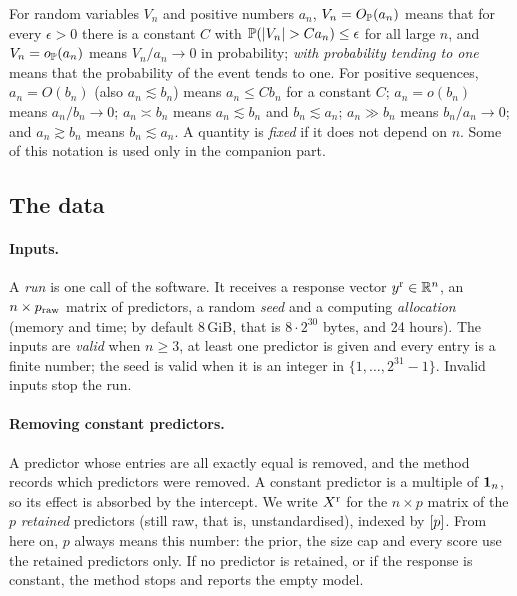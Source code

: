 \documentclass[11pt]{article}
\begin{document}
For random variables $V_n$ and positive numbers $a_n$, $V_n=O_{\mathbb{P}}(a_n)$ means that for every $\epsilon>0$ there is a
constant $C$ with $\mathbb{P}(\lvert V_n\rvert>Ca_n)\le\epsilon$ for all large $n$, and $V_n=o_{\mathbb{P}}(a_n)$ means $V_n/a_n\to0$ in
probability; \emph{with probability tending to one} means that the probability of the event tends to one. For positive
sequences, $a_n=O(b_n)$ (also $a_n\lesssim b_n$) means $a_n\le Cb_n$ for a constant $C$; $a_n=o(b_n)$ means
$a_n/b_n\to0$; $a_n\asymp b_n$ means $a_n\lesssim b_n$ and $b_n\lesssim a_n$; $a_n\gg b_n$ means $b_n/a_n\to0$; and
$a_n\gtrsim b_n$ means $b_n\lesssim a_n$. A quantity is \emph{fixed} if it does not depend on $n$. Some of this notation is
used only in the companion part.

\subsection{The data}\label{sec:m-data}

\paragraph{Inputs.} A \emph{run} is one call of the software. It receives a response vector $y^{\mathrm r}\in\mathbb{R}^n$, an $n\times p_{\mathrm{raw}}$
matrix of predictors, a random \emph{seed} and a computing \emph{allocation} (memory and time; by default 8\,GiB, that is $8\cdot2^{30}$ bytes, and 24
hours). The inputs are \emph{valid} when $n\ge3$, at least one predictor is given and every entry is a finite number; the
seed is valid when it is an integer in $\{1,\dots,2^{31}-1\}$. Invalid inputs stop the run.

\paragraph{Removing constant predictors.} A predictor whose entries are all exactly equal is removed, and the method
records which predictors were removed. A constant predictor is a multiple of $\mathbf{1}_n$, so its effect is absorbed by the
intercept. We write $X^{\mathrm r}$ for the $n\times p$ matrix of the $p$ \emph{retained} predictors (still raw, that is,
unstandardised), indexed by $[p]$. From here
on, $p$ always means this number: the prior, the size cap and every score use the retained predictors only. If no
predictor is retained, or if the response is constant, the method stops and reports the empty model.
\end{document}
